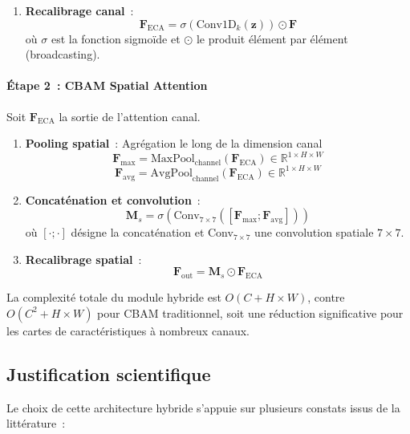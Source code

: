 \begin{onehalfspace}
\begin{enumerate}
\item \textbf{Recalibrage canal}~:
   \[
   \mathbf{F}_{\text{ECA}} = \sigma(\text{Conv1D}_k(\mathbf{z})) \odot \mathbf{F}
   \]
   où $\sigma$ est la fonction sigmoïde et $\odot$ le produit élément par élément (broadcasting).
\end{enumerate}

\paragraph{Étape 2~: CBAM Spatial Attention}

\hspace{0.65 cm}Soit $\mathbf{F}_{\text{ECA}}$ la sortie de l'attention canal.

\begin{enumerate}
\item \textbf{Pooling spatial}~: Agrégation le long de la dimension canal
   \[
   \mathbf{F}_{\text{max}} = \text{MaxPool}_{\text{channel}}(\mathbf{F}_{\text{ECA}}) \in \mathbb{R}^{1 \times H \times W}
   \]
   \[
   \mathbf{F}_{\text{avg}} = \text{AvgPool}_{\text{channel}}(\mathbf{F}_{\text{ECA}}) \in \mathbb{R}^{1 \times H \times W}
   \]

\item \textbf{Concaténation et convolution}~:
   \[
   \mathbf{M}_s = \sigma(\text{Conv}_{7 \times 7}([\mathbf{F}_{\text{max}}; \mathbf{F}_{\text{avg}}]))
   \]
   où $[\cdot; \cdot]$ désigne la concaténation et Conv$_{7 \times 7}$ une convolution spatiale $7 \times 7$.

\item \textbf{Recalibrage spatial}~:
   \[
   \mathbf{F}_{\text{out}} = \mathbf{M}_s \odot \mathbf{F}_{\text{ECA}}
   \]
\end{enumerate}

\hspace{0.65 cm}La complexité totale du module hybride est $O(C + H \times W)$, contre $O(C^2 + H \times W)$ pour CBAM traditionnel, soit une réduction significative pour les cartes de caractéristiques à nombreux canaux.

\subsection{Justification scientifique}

\hspace{0.65 cm}Le choix de cette architecture hybride s'appuie sur plusieurs constats issus de la littérature~:


\end{onehalfspace}
